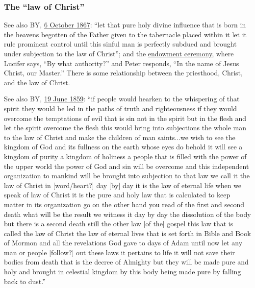 	\subsubsection{The ``law of Christ''}
		\label{LAW-christ}
		
		See also BY, \href{https://drive.google.com/file/d/1wV-mRM932G6giTCQENRd8CTtRAMDGdxa/view?usp=sharing}{6 October 1867}: ``let that pure holy divine influence that is born in the heavens begotten of the Father given to the tabernacle placed within it let it rule prominent control until this sinful man is perfectly subdued and brought under subjection to the law of Christ''; and the \hyperref[TEMPLE-ENDOWMENT-ENDOW-PRE-1990-TELESTIAL]{endowment ceremony}, where Lucifer says, ``By what authority?'' and Peter responds, ``In the name of Jesus Christ, our Master.'' There is some relationship between the priesthood, Christ, and the law of Christ.
		
		See also BY, \href{https://drive.google.com/file/d/1LeTIp6sAiAgnwayXKIlXGZIXZ8CPetpO/view?usp=sharing}{19 June 1859}: ``if people would hearken to the whispering of that spirit they would be led in the paths of truth and righteousness if they would overcome the temptations of evil that is sin not in the spirit but in the flesh and let the spirit overcome the flesh this would bring into subjections the whole man to the law of Christ and make the children of man saints...we wish to see the kingdom of God and its fullness on the earth whose eyes do behold it will see a kingdom of purity a kingdom of holiness a people that is filled with the power of the upper world the power of God and sin will be overcome and this independent organization to mankind will be brought into subjection to that law we call it the law of Christ in [word/heart?] day [by] day it is the law of eternal life when we speak of law of Christ it is the pure and holy law that is calculated to keep matter in its organization go on the other hand you read of the first and second death what will be the result we witness it day by day the dissolution of the body but there is a second death still the other law [of the] gospel this law that is called the law of Christ the law of eternal lives that is set forth in Bible and Book of Mormon and all the revelations God gave to days of Adam until now let any man or people [follow?] out these laws it pertains to life it will not save their bodies from death that is the decree of Almighty but they will be made pure and holy and brought in celestial kingdom by this body being made pure by falling back to dust.'' 
		
